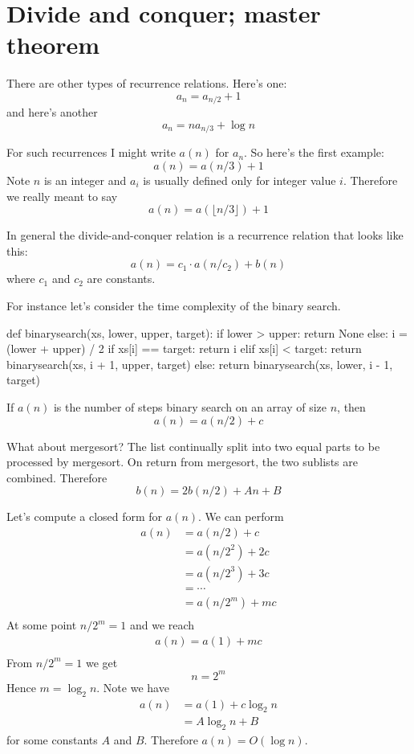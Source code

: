 \section{Divide and conquer; master theorem}

There are other types of recurrence relations.
Here's one:
\[
a_n = a_{n/2} + 1
\]
and here's another
\[
a_n = na_{n/3} + \log n
\]

For such recurrences I might write $a(n)$ for $a_n$.
So here's the first example:
\[
a(n) = a(n/3) + 1
\]
Note $n$ is an integer and $a_i$ is usually defined only for 
integer value $i$. 
Therefore we really meant to say
\[
a(n) = a( \lfloor n/3 \rfloor ) + 1
\]

In general the divide-and-conquer relation is a recurrence relation
that looks like this:
\[
a(n) = c_1 \cdot a(n/c_2) + b(n)
\]
where $c_1$ and $c_2$ are constants.

For instance let's consider the time complexity of the binary search.

\begin{console}
def binarysearch(xs, lower, upper, target):
    if lower > upper: return None
    else:
        i = (lower + upper) / 2
        if xs[i] == target:
            return i
        elif xs[i] < target:
            return binarysearch(xs, i + 1, upper, target)
        else:
            return binarysearch(xs, lower, i - 1, target)
\end{console}

If $a(n)$ is the number of steps binary search on an array of size $n$,
then 
\[
a(n) = a(n/2) + c
\]

What about mergesort? The list continually split into two equal parts
to be processed by mergesort. On return from mergesort, the two sublists
are combined. Therefore
\[
b(n) = 2b(n/2) + An + B
\]

Let's compute a closed form for $a(n)$.
We can perform 
\begin{align*}
a(n)
& = a(n/2) + c \\
& = a(n/2^2) + 2c \\
& = a(n/2^3) + 3c \\
& = \cdots \\
& = a(n/2^m) + mc \\
\end{align*}
At some point $n/2^m = 1$ and we reach
\begin{align*}
a(n) = a(1) + mc \\
\end{align*}
From $n / 2^m = 1$ we get
\[
n = 2^m
\]
Hence $m = \log_2 n$.
Note we have
\begin{align*}
a(n)
& = a(1) + c\log_2 n \\
& = A\log_2 n + B
\end{align*}
for some constants $A$ and $B$.
Therefore $a(n) = O(\log n)$.

